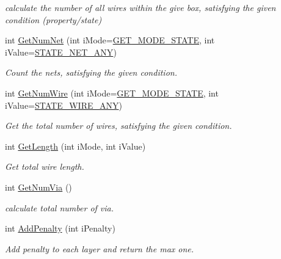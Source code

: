 \begin{DoxyCompactItemize}
\begin{DoxyCompactList}\small\item\em calculate the number of all wires within the give box, satisfying the given condition (property/state) \end{DoxyCompactList}\item 
int \mbox{\hyperlink{classCDesign_ac4221f754cb8ba12ac6344df3ca31d26}{Get\+Num\+Net}} (int i\+Mode=\mbox{\hyperlink{BoxRouter_8h_a6f72f2cc9dd31793dd832ccfb2547de4}{G\+E\+T\+\_\+\+M\+O\+D\+E\+\_\+\+S\+T\+A\+TE}}, int i\+Value=\mbox{\hyperlink{BoxRouter_8h_a048013954c49608419bca2bcccad5b17}{S\+T\+A\+T\+E\+\_\+\+N\+E\+T\+\_\+\+A\+NY}})
\begin{DoxyCompactList}\small\item\em Count the nets, satisfying the given condition. \end{DoxyCompactList}\item 
int \mbox{\hyperlink{classCDesign_a8a75e3e7df767d33c08f31076570ecb8}{Get\+Num\+Wire}} (int i\+Mode=\mbox{\hyperlink{BoxRouter_8h_a6f72f2cc9dd31793dd832ccfb2547de4}{G\+E\+T\+\_\+\+M\+O\+D\+E\+\_\+\+S\+T\+A\+TE}}, int i\+Value=\mbox{\hyperlink{BoxRouter_8h_a1b285251edd87e1423189470586cc719}{S\+T\+A\+T\+E\+\_\+\+W\+I\+R\+E\+\_\+\+A\+NY}})
\begin{DoxyCompactList}\small\item\em Get the total number of wires, satisfying the given condition. \end{DoxyCompactList}\item 
int \mbox{\hyperlink{classCDesign_a2ff679a94a04886d69604e7d6820830b}{Get\+Length}} (int i\+Mode, int i\+Value)
\begin{DoxyCompactList}\small\item\em Get total wire length. \end{DoxyCompactList}\item 
int \mbox{\hyperlink{classCDesign_a28c4e077c911fbe9259d3ade4b91898d}{Get\+Num\+Via}} ()
\begin{DoxyCompactList}\small\item\em calculate total number of via. \end{DoxyCompactList}\item 
int \mbox{\hyperlink{classCDesign_acd0487c3ffd7edf494d4b5d049bd9a3f}{Add\+Penalty}} (int i\+Penalty)
\begin{DoxyCompactList}\small\item\em Add penalty to each layer and return the max one. \end{DoxyCompactList}\item 

\end{DoxyCompactItemize}
